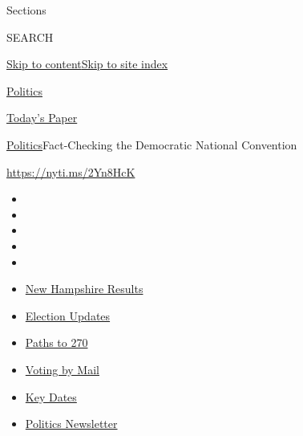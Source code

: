 Sections

SEARCH

\protect\hyperlink{site-content}{Skip to
content}\protect\hyperlink{site-index}{Skip to site index}

\href{https://www.nytimes3xbfgragh.onion/section/politics}{Politics}

\href{https://myaccount.nytimes3xbfgragh.onion/auth/login?response_type=cookie\&client_id=vi}{}

\href{https://www.nytimes3xbfgragh.onion/section/todayspaper}{Today's
Paper}

\href{/section/politics}{Politics}\textbar{}Fact-Checking the Democratic
National Convention

\url{https://nyti.ms/2Yn8HcK}

\begin{itemize}
\item
\item
\item
\item
\item
\end{itemize}

\begin{itemize}
\item
  \href{https://www.nytimes3xbfgragh.onion/interactive/2020/09/08/us/elections/results-new-hampshire-primary-elections.html?action=click\&pgtype=Article\&state=default\&region=TOP_BANNER\&context=storylines_menu}{New
  Hampshire Results}
\item
  \href{https://www.nytimes3xbfgragh.onion/live/2020/09/08/us/trump-vs-biden?action=click\&pgtype=Article\&state=default\&region=TOP_BANNER\&context=storylines_menu}{Election
  Updates}
\item
  \href{https://www.nytimes3xbfgragh.onion/interactive/2020/us/elections/election-states-biden-trump.html?action=click\&pgtype=Article\&state=default\&region=TOP_BANNER\&context=storylines_menu}{Paths
  to 270}
\item
  \href{https://www.nytimes3xbfgragh.onion/interactive/2020/08/31/us/politics/vote-by-mail-deadlines.html?action=click\&pgtype=Article\&state=default\&region=TOP_BANNER\&context=storylines_menu}{Voting
  by Mail}
\item
  \href{https://www.nytimes3xbfgragh.onion/interactive/2019/us/elections/2020-presidential-election-calendar.html?action=click\&pgtype=Article\&state=default\&region=TOP_BANNER\&context=storylines_menu}{Key
  Dates}
\item
  \href{https://www.nytimes3xbfgragh.onion/newsletters/politics?action=click\&pgtype=Article\&state=default\&region=TOP_BANNER\&context=storylines_menu}{Politics
  Newsletter}
\end{itemize}

